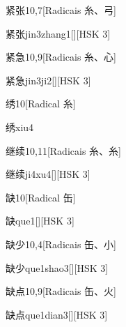 \begin{entry}{紧张}{10,7}[Radicais ⽷、⼸]
  \begin{phonetics}{紧张}{jin3zhang1}[][HSK 3]
  \end{phonetics}
\end{entry}

\begin{entry}{紧急}{10,9}[Radicais ⽷、⼼]
  \begin{phonetics}{紧急}{jin3ji2}[][HSK 3]
  \end{phonetics}
\end{entry}

\begin{entry}{绣}{10}[Radical ⽷]
  \begin{phonetics}{绣}{xiu4}
  \end{phonetics}
\end{entry}

\begin{entry}{继续}{10,11}[Radicais ⽷、⽷]
  \begin{phonetics}{继续}{ji4xu4}[][HSK 3]
  \end{phonetics}
\end{entry}

\begin{entry}{缺}{10}[Radical ⽸]
  \begin{phonetics}{缺}{que1}[][HSK 3]
  \end{phonetics}
\end{entry}

\begin{entry}{缺少}{10,4}[Radicais ⽸、⼩]
  \begin{phonetics}{缺少}{que1shao3}[][HSK 3]
  \end{phonetics}
\end{entry}

\begin{entry}{缺点}{10,9}[Radicais ⽸、⽕]
  \begin{phonetics}{缺点}{que1dian3}[][HSK 3]
  \end{phonetics}
\end{entry}

